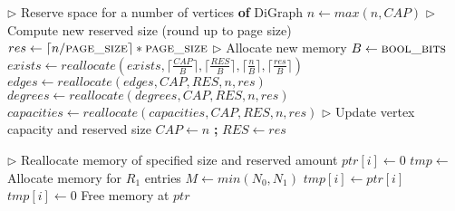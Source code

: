 \begin{algorithm}[hbtp]
\begin{algorithmic}[1]
\State $\rhd$ Reserve space for a number of vertices
 \textbf{of} DiGraph \label{alg:digraph--reserve-begin}
  \State $n \gets max(n, CAP)$
  \State $\rhd$ Compute new reserved size (round up to page size)
  \State $res \gets \lceil n / \textsc{page\_size} \rceil * \textsc{page\_size}$
   \ReturnInline{}
  \EndIf
  \State $\rhd$ Allocate new memory
  \State $B \gets \textsc{bool\_bits}$
  \State $exists \gets reallocate(exists, \lceil \frac{CAP}{B} \rceil, \lceil \frac{RES}{B} \rceil, \lceil \frac{n}{B} \rceil, \lceil \frac{res}{B} \rceil)$
  \State $edges \gets reallocate(edges, CAP, RES, n, res)$
  \State $degrees \gets reallocate(degrees, CAP, RES, n, res)$
  \State $capacities \gets reallocate(capacities, CAP, RES, n, res)$
  \State $\rhd$ Update vertex capacity and reserved size
  \State $CAP \gets n$ \textbf{;} $RES \gets res$
\EndFunction \label{alg:digraph--reserve-end}

\Statex

\State $\rhd$ Reallocate memory of specified size and reserved amount
 \label{alg:digraph--reallocate-begin}
   
    \ForAll{$i \in [N_0, N_1)$ \textbf{in parallel}} $ptr[i] \gets 0$
    \EndFor
  \EndIf
  \State $tmp \gets$ Allocate memory for $R_1$ entries
  \State $M \gets min(N_0, N_1)$
  \ForAll{$i \in [0, M)$ \textbf{in parallel}} $tmp[i] \gets ptr[i]$
  \EndFor
  \ForAll{$i \in [M, N_1)$ \textbf{in parallel}} $tmp[i] \gets 0$
  \EndFor
  \State Free memory at $ptr$
\EndFunction \label{alg:digraph--reallocate-end}
\end{algorithmic}
\end{algorithm}
